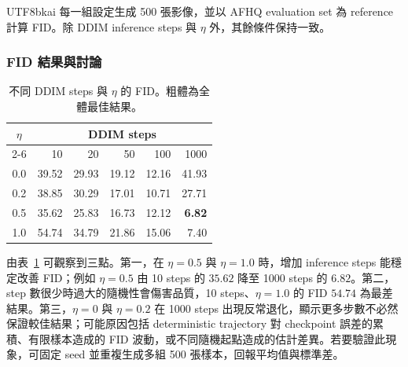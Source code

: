 \documentclass[11pt,a4paper]{article}
\newcommand{\code}[1]{\texttt{#1}}
\begin{document}
\begin{CJK*}{UTF8}{bkai}
每一組設定生成 500 張影像，並以 AFHQ evaluation set 為 reference 計算 FID。除 DDIM inference steps 與 $\eta$ 外，其餘條件保持一致。


\subsubsection{FID 結果與討論}

\begin{table}[H]
  \centering
  \caption{不同 DDIM steps 與 $\eta$ 的 FID。粗體為全體最佳結果。}
  \label{tab:fid}
  \begin{tabular}{c|rrrrr}
    \toprule
    \multirow{2}{*}{$\eta$} & \multicolumn{5}{c}{DDIM steps} \\
    \cmidrule(lr){2-6}
      & 10 & 20 & 50 & 100 & 1000 \\
    \midrule
    0.0 & 39.52 & 29.93 & 19.12 & 12.16 & 41.93 \\
    0.2 & 38.85 & 30.29 & 17.01 & 10.71 & 27.71 \\
    0.5 & 35.62 & 25.83 & 16.73 & 12.12 & \textbf{6.82} \\
    1.0 & 54.74 & 34.79 & 21.86 & 15.06 & 7.40 \\
    \bottomrule
  \end{tabular}
\end{table}
\newpage
由表~\ref{tab:fid} 可觀察到三點。第一，在 $\eta=0.5$ 與 $\eta=1.0$ 時，增加 inference steps 能穩定改善 FID；例如 $\eta=0.5$ 由 10 steps 的 $35.62$ 降至 1000 steps 的 $6.82$。第二，step 數很少時過大的隨機性會傷害品質，10 steps、$\eta=1.0$ 的 FID $54.74$ 為最差結果。第三，$\eta=0$ 與 $\eta=0.2$ 在 1000 steps 出現反常退化，顯示更多步數不必然保證較佳結果；可能原因包括 deterministic trajectory 對 checkpoint 誤差的累積、有限樣本造成的 FID 波動，或不同隨機起點造成的估計差異。若要驗證此現象，可固定 seed 並重複生成多組 500 張樣本，回報平均值與標準差。


\end{CJK*}
\end{document}
